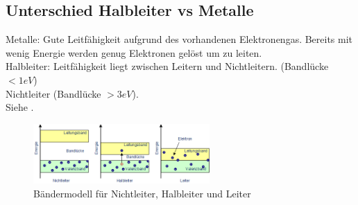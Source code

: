 \subsection{Unterschied Halbleiter vs Metalle }\label{k2:metalle}
Metalle: Gute Leitf\"ahigkeit aufgrund des vorhandenen Elektronengas. Bereits mit wenig Energie werden genug Elektronen gel\"ost um zu leiten.\\
Halbleiter: Leitf\"ahigkeit liegt zwischen Leitern und Nichtleitern. (Bandl\"ucke $< 1eV$)\\
Nichtleiter (Bandl\"ucke $> 3eV$).\\
Siehe .
\begin{figure}[h]
        \centering
        \includegraphics[width=0.6\textwidth]{fig/baendermodellLHL}
        \caption{B\"andermodell f\"ur Nichtleiter, Halbleiter und Leiter}
        \label{fig:bandLHL}
\end{figure}

